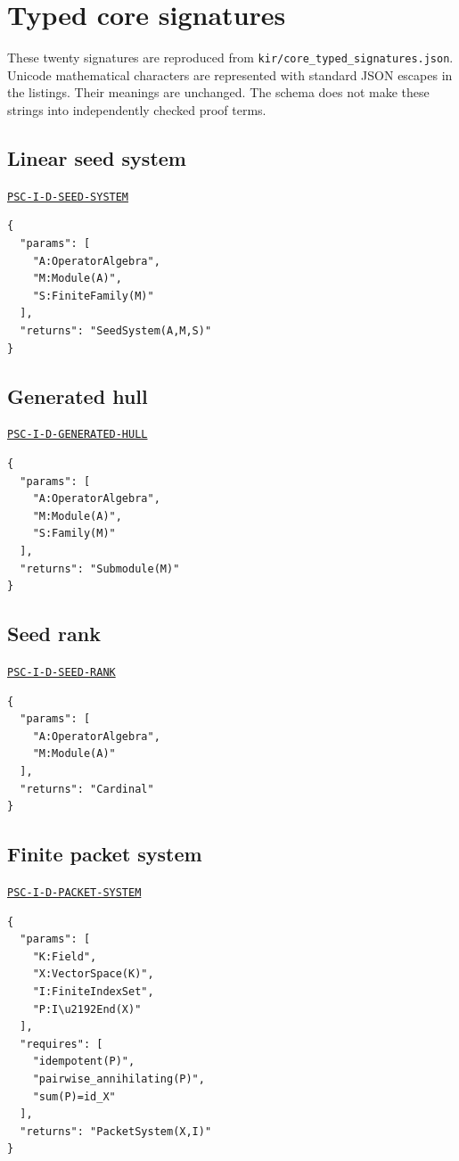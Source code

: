 \documentclass[a4paper,11pt]{article}
\begin{document}

\clearpage\section{Typed core signatures}
These twenty signatures are reproduced from \nolinkurl{kir/core_typed_signatures.json}. Unicode mathematical characters are represented with standard JSON escapes in the listings. Their meanings are unchanged. The schema does not make these strings into independently checked proof terms.
\subsection*{Linear seed system}
\hyperref[rec:PSC-I-D-SEED-SYSTEM]{\nolinkurl{PSC-I-D-SEED-SYSTEM}}
\begin{lstlisting}
{
  "params": [
    "A:OperatorAlgebra",
    "M:Module(A)",
    "S:FiniteFamily(M)"
  ],
  "returns": "SeedSystem(A,M,S)"
}
\end{lstlisting}
\subsection*{Generated hull}
\hyperref[rec:PSC-I-D-GENERATED-HULL]{\nolinkurl{PSC-I-D-GENERATED-HULL}}
\begin{lstlisting}
{
  "params": [
    "A:OperatorAlgebra",
    "M:Module(A)",
    "S:Family(M)"
  ],
  "returns": "Submodule(M)"
}
\end{lstlisting}
\subsection*{Seed rank}
\hyperref[rec:PSC-I-D-SEED-RANK]{\nolinkurl{PSC-I-D-SEED-RANK}}
\begin{lstlisting}
{
  "params": [
    "A:OperatorAlgebra",
    "M:Module(A)"
  ],
  "returns": "Cardinal"
}
\end{lstlisting}
\subsection*{Finite packet system}
\hyperref[rec:PSC-I-D-PACKET-SYSTEM]{\nolinkurl{PSC-I-D-PACKET-SYSTEM}}
\begin{lstlisting}
{
  "params": [
    "K:Field",
    "X:VectorSpace(K)",
    "I:FiniteIndexSet",
    "P:I\u2192End(X)"
  ],
  "requires": [
    "idempotent(P)",
    "pairwise_annihilating(P)",
    "sum(P)=id_X"
  ],
  "returns": "PacketSystem(X,I)"
}
\end{lstlisting}
\end{document}
